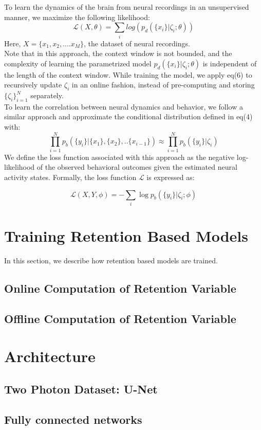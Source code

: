To learn the dynamics of the brain from neural recordings in an unsupervised manner, we maximize the following likelihood:
\begin{equation}
    \mathcal{L}(X,\theta) = \sum_i log(p_d(\{x_{i}\}|\zeta_i;\theta))
\end{equation}
Here, $X = \{x_1,x_2,....x_M\}$, the dataset of neural recordings. \\

Note that in this approach, the context window is not bounded, and the complexity of learning the parametrized model $p_d(\{x_{i}\}|\zeta_i;\theta)$ is independent of the length of the context window. While training the model, we apply eq(6) to recursively update $\zeta_i$ in an online fashion, instead of pre-computing and storing $\{\zeta_i\}_{i=1}^N$ separately.
 \\

 To learn the correlation between neural dynamics and behavior, we follow a similar approach and approximate the conditional distribution defined in eq(4) with:
\\
 \begin{equation}
   \prod_{i=1}^{N} p_b(\{y_{i}\}| \{x_1\},\{x_2\},..\{x_{i-1}\}) 
   \approx  \prod_{i=1}^{N} p_b(\{y_{i}\}|\zeta_i)
\end{equation}
We define the loss function associated with this approach as the negative log-likelihood of the observed behavioral outcomes given the estimated neural activity states. Formally, the loss function \( \mathcal{L} \) is expressed as:

\[
\mathcal{L}(X,Y,\phi) = -\sum_{i} \log p_b(\{y_i\}|\zeta_i;\phi)
\]

\section{Training Retention Based Models}
In this section, we describe how retention based models are trained. 
\subsection{Online Computation of Retention Variable}

\subsection{Offline Computation of Retention Variable}



\section{Architecture}
\subsection{Two Photon Dataset: U-Net}
\subsection{Fully connected networks}